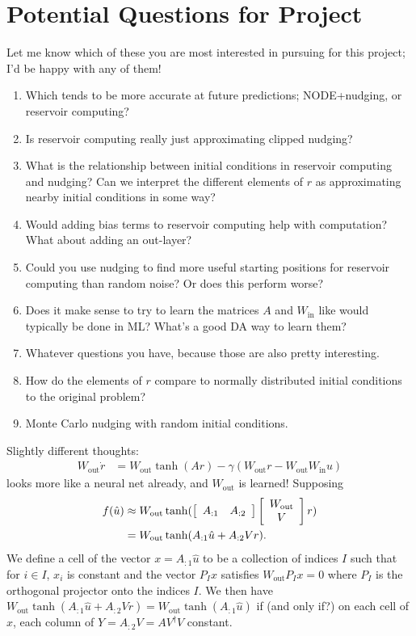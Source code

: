 \documentclass{article}
\newcommand{\mat}[2]{
    \IfInteger{#1}{
        \left[\begin{array}{*{#1}c} #2 \end{array}\right]
    }{
        \left[\begin{array}{#1} #2 \end{array}\right]}
    }
\newcommand{\Wout}{W_{\text{out}}}
\newcommand{\Win}{W_{\text{in}}}
\begin{document}
\section{Potential Questions for Project}
Let me know which of these you are most interested in pursuing for this project; I'd be happy with any of them!
\begin{enumerate}
    \item Which tends to be more accurate at future predictions; NODE+nudging, or reservoir computing?

    \item Is reservoir computing really just approximating clipped nudging?

    \item What is the relationship between initial conditions in reservoir computing and nudging? Can we interpret the different elements of $r$ as approximating nearby initial conditions in some way?

    \item Would adding bias terms to reservoir computing help with computation? What about adding an out-layer?

    \item Could you use nudging to find more useful starting positions for reservoir computing than random noise? Or does this perform worse?

    \item Does it make sense to try to learn the matrices $A$ and $\Win$ like would typically be done in ML? What's a good DA way to learn them?

    \item Whatever questions you have, because those are also pretty interesting.

    \item How do the elements of $r$ compare to normally distributed initial conditions to the original problem?

    \item Monte Carlo nudging with random initial conditions.
\end{enumerate}

Slightly different thoughts:
\begin{align*}
    \Wout \dot r &= \Wout \tanh(Ar) -\gamma (\Wout r - \Wout \Win u)
\end{align*}
looks more like a neural net already, and $\Wout$ is learned! Supposing 
\begin{align*}
    f(\hat u) &\approx \Wout \tanh (\mat{2}{A_{:1} & A_{:2}}\mat{1}{\Wout \\ V}r)
    \\
    &= \Wout \tanh(A_{:1}\hat u + A_{:2} Vr).
\end{align*}
We define a cell of the vector $x=A_{:1}\hat u $ to be a collection of indices $I$ such that for $i\in I$, $x_i$ is constant and the vector $P_I x$ satisfies $\Wout P_I x = 0$ where $P_I$ is the orthogonal projector onto the indices $I$. We then have $\Wout \tanh(A_{:1}\hat u + A_{:2} Vr) =  \Wout \tanh(A_{:1}\hat u)$ if (and only if?) on each cell of $x$, each column of $Y = A_{:2}V = AV^\dagger V$ constant.
\end{document}
